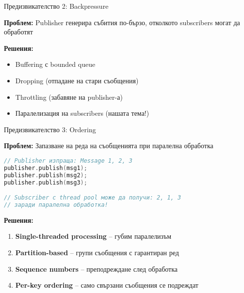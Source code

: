 \documentclass[aspectratio=169]{beamer}
\begin{document}
\begin{frame}{Предизвикателство 2: Backpressure}

\textbf{Проблем:} Publisher генерира събития по-бързо, отколкото subscribers могат да обработят

\begin{center}
\end{center}

\textbf{Решения:}
\begin{itemize}
    \item Buffering с bounded queue
    \item Dropping (отпадане на стари съобщения)
    \item Throttling (забавяне на publisher-а)
    \item Паралелизация на subscribers (нашата тема!)
\end{itemize}
\end{frame}

\begin{frame}{Предизвикателство 3: Ordering}

\textbf{Проблем:} Запазване на реда на съобщенията при паралелна обработка\\

\begin{lstlisting}[basicstyle=\ttfamily\tiny, language=C++]
// Publisher изпраща: Message 1, 2, 3
publisher.publish(msg1);
publisher.publish(msg2);
publisher.publish(msg3);

// Subscriber с thread pool може да получи: 2, 1, 3
// заради паралелна обработка!
\end{lstlisting}

\textbf{Решения:}
\begin{enumerate}
    \item \textbf{Single-threaded processing} – губим паралелизъм
    \item \textbf{Partition-based} – групи съобщения с гарантиран ред
    \item \textbf{Sequence numbers} – преподреждане след обработка
    \item \textbf{Per-key ordering} – само свързани съобщения се подреждат
\end{enumerate}
\end{frame}
\end{document}
